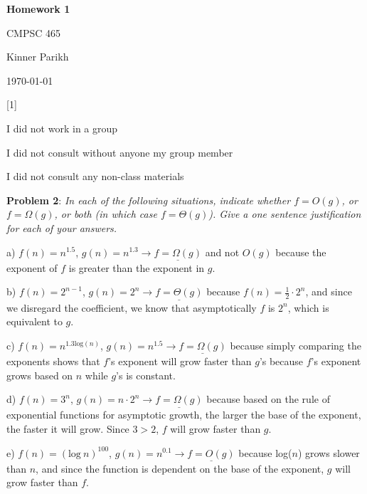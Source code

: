 \documentclass{article} %
\newcommand{\question}[2][]{\begin{flushleft}
        \textbf{Problem #1}: \textit{#2}

\end{flushleft}}
\newcommand{\maketitletwo}[2][]{\begin{center}
        \Large{\textbf{Homework #1}
            
            CMPSC 465} %
        \vspace{5pt}
        
        \normalsize{Kinner Parikh  %
        
        \today}        %
        \vspace{40pt}


        \newpage
        
\end{center}}
\begin{document}
    \maketitletwo[1]  %

    \question[1]{}
    \begin{center}
        
        I did not work in a group
    
        I did not consult without anyone my group member
    
        I did not consult any non-class materials
    \end{center}
    
    \newpage

    \question[2]{In each of the following situations, indicate whether $f = O(g)$, or $f = \Omega(g)$,
     or both (in which case $f = \Theta(g)$). Give a one sentence justification for each of your answers.}

    a) $f(n) = n^{1.5}$, $g(n) = n^{1.3} \rightarrow \underline{f = \Omega(g)}$ and not $O(g)$ 
    because the exponent of $f$ is greater than 
    \tabto{27pt} the exponent in $g$. 
    
    \vspace{5pt}

    b) $f(n) = 2^{n-1}$, $g(n) = 2^n \rightarrow \underline{f = \Theta(g)}$ 
    because $f(n) = \frac{1}{2} \cdot 2^n$, and since we disregard the 
    \tabto{28pt} coefficient, we know that asymptotically $f$ is $2^n$, which is equivalent to $g$.

    \vspace{5pt}

    c) $f(n) = n^{1.3 \text{log}(n)}$, $g(n) = n^{1.5} \rightarrow \underline{f = \Omega(g)}$ 
    because simply comparing the exponents shows 
    \tabto{27pt} that $f$'s exponent will grow faster than $g$'s because $f$'s exponent grows based on $n$ while $g$'s 
    \tabto{27pt} is constant.

    \vspace{5pt}

    d) $f(n) = 3^n$, $g(n) = n \cdot 2^n \rightarrow \underline{f = \Omega(g)}$ 
    because based on the rule of exponential functions for 
    \tabto{28pt} asymptotic growth, the larger the base of the exponent, the faster it will grow. Since $3 > 2$, 
    \tabto{28pt} $f$ will grow faster than $g$.

    \vspace{5pt}

    e) $f(n) = (\text{log}\ n)^{100}$, $g(n) = n^{0.1} \rightarrow \underline{f = O(g)}$ 
    because log($n$) grows slower than $n$, and since 
    \tabto{28pt} the function is dependent on the base of the exponent, $g$ will grow faster than $f$.
\end{document}
